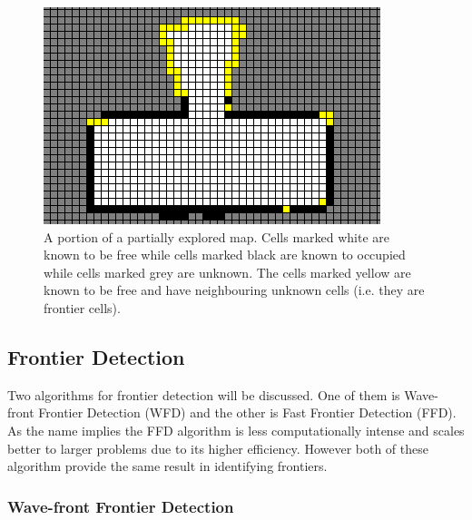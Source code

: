 \documentclass[a4paper,12pt]{article}
\begin{document}
			\begin{figure}[H]
				\centering
				\includegraphics[scale=0.6]{images/frontierExample.png}
				\caption{A portion of a partially explored map. Cells marked white are known to be free while cells marked black are known to occupied while cells marked grey are unknown. The cells marked yellow are known to be free and have neighbouring unknown cells (i.e. they are frontier cells).}
				\label{frontierExample}
			\end{figure}

			\subsection{Frontier Detection}

				Two algorithms for frontier detection will be discussed. One of them is Wave-front Frontier Detection (WFD) and the other is Fast Frontier Detection (FFD). As the name implies the FFD algorithm is less computationally intense and scales better to larger problems due to its higher efficiency. However both of these algorithm provide the same result in identifying frontiers.
				
				\subsubsection{Wave-front Frontier Detection}
\end{document}
